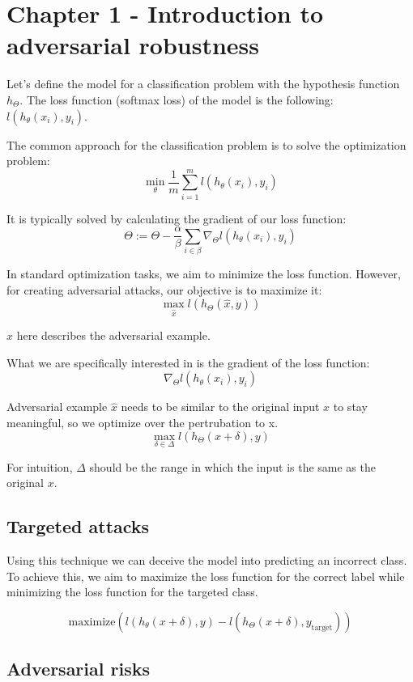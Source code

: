 \section{Chapter 1 - Introduction to adversarial robustness}
Let's define the model for a classification problem with the hypothesis function $h_\Theta$.  The loss function (softmax loss) of the model is the following:
$l(h_{\theta}(x_{i}), y_{i})$.




The common approach for the classification problem is to solve the optimization problem:
\[\min_{\theta} \frac{1}{m} \sum_{i=1}^{m} l(h_{\theta}(x_{i}), y_{i})\]

It is typically solved by calculating the gradient of our loss function:
\[ \Theta := \Theta - \dfrac{\alpha}{\beta} \sum_{i \in \beta} \nabla_\Theta l (h_{\theta}(x_{i}), y_{i}) \]

In standard optimization tasks, we aim to minimize the loss function. However, for creating adversarial attacks, our objective is to maximize it:
\[\max_{\hat{x}} l(h_{\Theta}(\hat{x}, y))\]

$\hat x$ here describes the adversarial example.

What we are specifically interested in is the gradient of the loss function:
\[  \nabla_\Theta l (h_{\theta}(x_{i}), y_{i}) \]

Adversarial example $\hat{x}$ needs to be similar to the original input $x$ to stay meaningful, so we optimize over the pertrubation to x.
\[\max_{\delta \in \Delta} l (h_{\Theta}(x+\delta), y)\]

For intuition, $\Delta$ should be the range in which the input is the same as the original $x$.


\subsection{Targeted attacks}
Using this technique we can deceive the model into predicting an incorrect class. To achieve this, we aim to maximize the loss function for the correct label while minimizing the loss 
function for the targeted class. 

\[\text{maximize} \left( l(h_{\theta}(x + \delta), y) - l(h_{\Theta}(x + \delta), y_{\text{target}}) \right)
\]


\subsection{Adversarial risks}

